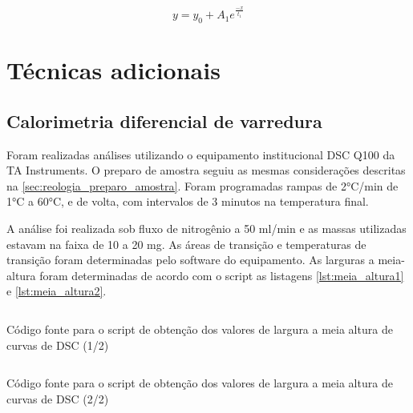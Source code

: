 			\begin{equation}
				y = y_0 + A_1 e^{\frac{-x}{t_1}}
				\label{eqn:decaimento_exponencial}
			\end{equation}
			
	\chapter{Técnicas adicionais}
		\section{Calorimetria diferencial de varredura}  
		
		Foram realizadas análises utilizando o equipamento institucional DSC Q100 da TA Instruments. O preparo de amostra seguiu as mesmas considerações descritas na \autoref{sec:reologia_preparo_amostra}. Foram programadas rampas de 2°C/min de 1°C a 60°C, e de volta, com intervalos de 3 minutos na temperatura final.
		
		
		A análise foi realizada sob fluxo de nitrogênio a 50 ml/min e as massas utilizadas estavam na faixa de 10 a 20 mg. As áreas de transição e temperaturas de transição foram determinadas pelo software do equipamento. As larguras a meia-altura foram determinadas de acordo com o script as listagens \ref{lst:meia_altura1} e \ref{lst:meia_altura2}.
		
		\begin{listing}[h]
			\inputminted{python}{./python/meia_altura1.py}
			\caption{Código fonte para o script de obtenção dos valores de largura a meia altura de curvas de DSC (1/2)} 
			\label{lst:meia_altura1}
		\end{listing}
		
		\begin{listing}[h]
			\inputminted{python}{./python/meia_altura2.py}
			\caption{Código fonte para o script de obtenção dos valores de largura a meia altura de curvas de DSC (2/2)} 
			\label{lst:meia_altura2}
		\end{listing}


